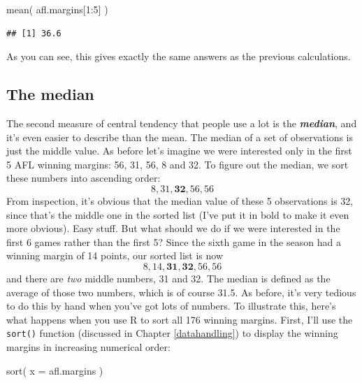\documentclass[
]{book}
\newenvironment{Shaded}{\begin{snugshade}}{\end{snugshade}}
\newcommand{\AttributeTok}[1]{\textcolor[rgb]{0.77,0.63,0.00}{#1}}
\newcommand{\DecValTok}[1]{\textcolor[rgb]{0.00,0.00,0.81}{#1}}
\newcommand{\FunctionTok}[1]{\textcolor[rgb]{0.00,0.00,0.00}{#1}}
\newcommand{\NormalTok}[1]{#1}
\newcommand{\SpecialCharTok}[1]{\textcolor[rgb]{0.00,0.00,0.00}{#1}}
\begin{document}
\begin{Shaded}
\begin{Highlighting}[]
\FunctionTok{mean}\NormalTok{( afl.margins[}\DecValTok{1}\SpecialCharTok{:}\DecValTok{5}\NormalTok{] )}
\end{Highlighting}
\end{Shaded}

\begin{verbatim}
## [1] 36.6
\end{verbatim}

As you can see, this gives exactly the same answers as the previous calculations.

\hypertarget{median}{%
\subsection{The median}\label{median}}

The second measure of central tendency that people use a lot is the \textbf{\emph{median}}, and it's even easier to describe than the mean. The median of a set of observations is just the middle value. As before let's imagine we were interested only in the first 5 AFL winning margins: 56, 31, 56, 8 and 32. To figure out the median, we sort these numbers into ascending order:
\[
8, 31, \mathbf{32}, 56, 56
\]
From inspection, it's obvious that the median value of these 5 observations is 32, since that's the middle one in the sorted list (I've put it in bold to make it even more obvious). Easy stuff. But what should we do if we were interested in the first 6 games rather than the first 5? Since the sixth game in the season had a winning margin of 14 points, our sorted list is now
\[
8, 14, \mathbf{31}, \mathbf{32}, 56, 56
\]
and there are \emph{two} middle numbers, 31 and 32. The median is defined as the average of those two numbers, which is of course 31.5. As before, it's very tedious to do this by hand when you've got lots of numbers. To illustrate this, here's what happens when you use R to sort all 176 winning margins. First, I'll use the \texttt{sort()} function (discussed in Chapter \ref{datahandling}) to display the winning margins in increasing numerical order:

\begin{Shaded}
\begin{Highlighting}[]
\FunctionTok{sort}\NormalTok{( }\AttributeTok{x =}\NormalTok{ afl.margins )}
\end{Highlighting}
\end{Shaded}
\end{document}
